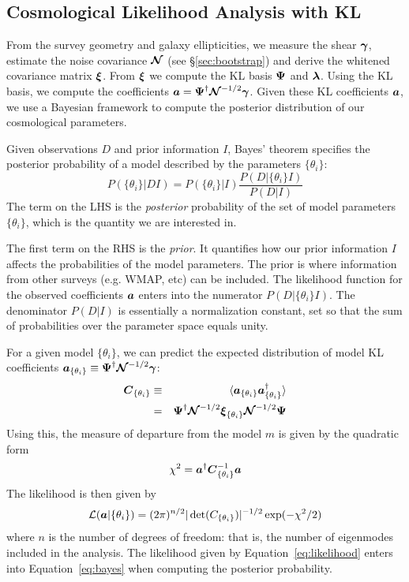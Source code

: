 \subsection{Cosmological Likelihood Analysis with KL}
From the survey geometry and galaxy ellipticities, we measure the
shear $\boldsymbol{\gamma}$, estimate the noise covariance
$\boldsymbol{\mathcal{N}}$ (see \S\ref{sec:bootstrap}) and derive
the whitened covariance matrix $\boldsymbol{\xi}$. 
From $\boldsymbol{\xi}$ we compute the KL basis $\boldsymbol{\Psi}$ and $\boldsymbol{\lambda}$.
Using the KL basis, we compute the coefficients
$\boldsymbol{a} = \boldsymbol{\Psi}^\dagger \boldsymbol{\mathcal{N}}^{-1/2} \boldsymbol{\gamma}$.
Given these KL coefficients $\boldsymbol{a}$, we use a Bayesian framework to
compute the posterior distribution of our cosmological parameters.

Given observations $D$ and prior information $I$, Bayes' theorem specifies the
posterior probability of a model described by the parameters $\{\theta_i\}$:
\begin{equation}
  \label{eq:bayes}
  P(\{\theta_i\}|DI) = P(\{\theta_i\}|I) \frac{P(D|\{\theta_i\}I)}{P(D|I)}
\end{equation}
The term on the LHS is the \textit{posterior} probability of the set of
model parameters $\{\theta_i\}$, which is the quantity we are interested in.

The first term on the RHS is the \textit{prior}.  It quantifies how our prior
information $I$ affects the probabilities of the model parameters.  The 
prior is where information from other surveys (e.g. WMAP, etc) can be
included. The likelihood function for the observed coefficients $\boldsymbol{a}$
enters into the numerator $P(D|\{\theta_i\}I)$.  The denominator $P(D|I)$
is essentially a normalization constant, set so that the sum of probabilities
over the parameter space equals unity.

For a given model $\{\theta_i\}$, we can predict the expected distribution of model KL
coefficients $\boldsymbol{a}_{\{\theta_i\}} \equiv \boldsymbol{\Psi}^\dagger
\boldsymbol{\mathcal{N}}^{-1/2}\boldsymbol{\gamma}$:
\begin{eqnarray}
  \boldsymbol{C}_{\{\theta_i\}}
  & \equiv & \langle\boldsymbol{a}_{\{\theta_i\}}
  \boldsymbol{a}_{\{\theta_i\}}^\dagger\rangle\nonumber\\
  &=& \boldsymbol{\Psi}^\dagger \boldsymbol{\mathcal{N}}^{-1/2} 
  \boldsymbol{\xi}_{\{\theta_i\}}\boldsymbol{\mathcal{N}}^{-1/2}\boldsymbol{\Psi}
\end{eqnarray}
Using this, the measure of departure from the model $m$ is given by the
quadratic form
\begin{equation}
  \chi^2 = \boldsymbol{a}^\dagger\boldsymbol{C}_{\{\theta_i\}}^{-1}\boldsymbol{a}
\end{equation}
The likelihood is then given by
\begin{equation}
  \label{eq:likelihood}
  \mathcal{L}(\boldsymbol{a}|\{\theta_i\}) = 
  (2\pi)^{n/2} |\det(C_{\{\theta_i\}})|^{-1/2}
  \exp(-\chi^2/2)
\end{equation}
where $n$ is the number of degrees of freedom: that is, the number
of eigenmodes included in the analysis.  The likelihood given by
Equation~\ref{eq:likelihood} enters into Equation~\ref{eq:bayes} when
computing the posterior probability.


